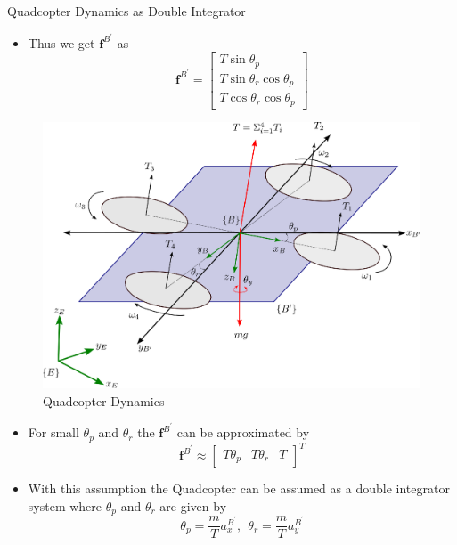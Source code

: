 \documentclass[10pt]{beamer}
\begin{document}
\begin{frame}{Quadcopter Dynamics as Double Integrator}
\begin{minipage}{0.47\textwidth}
\begin{itemize}
			\item Thus we get $\mathbf{f}^{B^{\prime}}$ as
			      \begin{equation*}
				      \mathbf{f}^{B^{\prime}}=\begin{bmatrix}
					      T\sin{\theta_{p}}                 \\
					      T\sin{\theta_{r}}\cos{\theta_{p}} \\
					      T\cos{\theta_{r}}\cos{\theta_{p}}
				      \end{bmatrix}
			      \end{equation*}
		\end{itemize}
	\end{minipage}
	\begin{minipage}{0.47\textwidth}
		\begin{figure}[h!]
			\centering
			\includegraphics[scale=0.28]{Quadcopter.eps}
			\caption{Quadcopter Dynamics}
			\label{Fig:Quadcopter Dynamics}
		\end{figure}
	\end{minipage}
	\pause
	\begin{itemize}
		\item For small $\theta_{p}$ and $\theta_{r}$ the $\mathbf{f}^{B^{\prime}}$ can be approximated by
		      \begin{equation*}
			      \mathbf{f}^{B^{\prime}} \approx \begin{bmatrix}
				      T\theta_{p} & T\theta_{r} & T
			      \end{bmatrix}^{T}
		      \end{equation*}
		\item With this assumption the Quadcopter can be assumed as a double integrator system where $\theta_{p}$ and $\theta_{r}$ are given by
		      \begin{equation*}
			      \theta_{p} = \dfrac{m}{T}a_{x}^{B^{\prime}},~~\theta_{r} = \dfrac{m}{T}a_{y}^{B^{\prime}}
		      \end{equation*}
	\end{itemize}
\end{frame}
\end{document}
